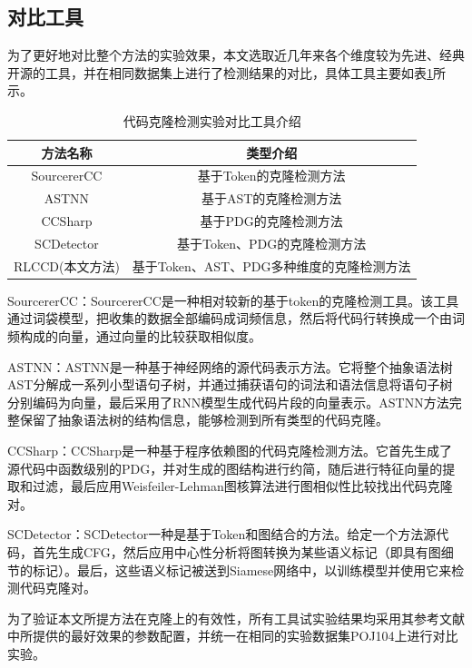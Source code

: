 \subsection{对比工具}

为了更好地对比整个方法的实验效果，本文选取近几年来各个维度较为先进、经典开源的工具，并在相同数据集上进行了检测结果的对比，具体工具主要如表\ref{tab:tool}所示。

\begin{table}[htp]
  \centering
  \caption{代码克隆检测实验对比工具介绍} 
  \label{tab:tool}
  \renewcommand{\arraystretch}{1.1}
  \begin{tabular*}{0.8\textwidth}{@{\extracolsep{\fill}}cc}
  \toprule
    方法名称			&类型介绍		\\
  \midrule
  SourcererCC		 &基于Token的克隆检测方法 \\
  ASTNN			     &基于AST的克隆检测方法 \\
  CCSharp		     &基于PDG的克隆检测方法 \\
  SCDetector		 &基于Token、PDG的克隆检测方法 \\
  RLCCD(本文方法)	&基于Token、AST、PDG多种维度的克隆检测方法 \\
  \bottomrule
  \end{tabular*}
\end{table}

SourcererCC\cite{7886988}：SourcererCC是一种相对较新的基于token的克隆检测工具。该工具通过词袋模型，把收集的数据全部编码成词频信息，然后将代码行转换成一个由词频构成的向量，通过向量的比较获取相似度。

ASTNN\cite{8812062}：ASTNN是一种基于神经网络的源代码表示方法。它将整个抽象语法树AST分解成一系列小型语句子树，并通过捕获语句的词法和语法信息将语句子树分别编码为向量，最后采用了RNN模型生成代码片段的向量表示。ASTNN方法完整保留了抽象语法树的结构信息，能够检测到所有类型的代码克隆。

CCSharp\cite{9286111}：CCSharp是一种基于程序依赖图的代码克隆检测方法。它首先生成了源代码中函数级别的PDG，并对生成的图结构进行约简，随后进行特征向量的提取和过滤，最后应用Weisfeiler-Lehman图核算法进行图相似性比较找出代码克隆对。

SCDetector\cite{10.1145/3324884.3416562}：SCDetector一种是基于Token和图结合的方法。给定一个方法源代码，首先生成CFG，然后应用中心性分析将图转换为某些语义标记（即具有图细节的标记）。最后，这些语义标记被送到Siamese网络中，以训练模型并使用它来检测代码克隆对。

为了验证本文所提方法在克隆上的有效性，所有工具试实验结果均采用其参考文献中所提供的最好效果的参数配置，并统一在相同的实验数据集POJ104上进行对比实验。

